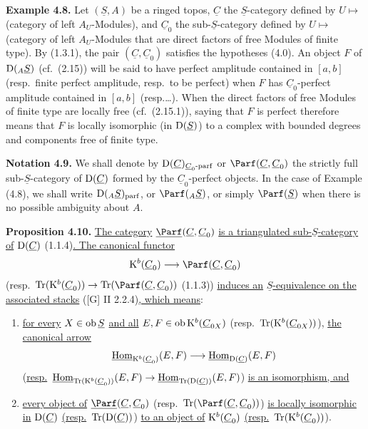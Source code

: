 \textbf{Example 4.8.} Let \((\underline{S},A)\) be a ringed topos, \(\underline{C}\) the \(\underline{S}\)-category defined by \(U\longmapsto\) (category of left \(A_U\)-Modules), and \(\underline{C}_0\) the sub-\(\underline{S}\)-category defined by \(U\longmapsto\) (category of left \(A_U\)-Modules that are direct factors of free Modules of finite type). By (1.3.1), the pair \((\underline{C},\underline{C}_0)\) satisfies the hypotheses (4.0). An object \(F\) of \(\mathrm D(_A \underline{S})\) (cf.\ (2.15)) will be said to have perfect amplitude contained in \([a,b]\) (resp.\ finite perfect amplitude, resp.\ to be perfect) when \(F\) has \(\underline{C}_0\)-perfect amplitude contained in \([a,b]\) (resp.\dots). When the direct factors of free Modules of finite type are locally free (cf.\ (2.15.1)), saying that \(F\) is perfect therefore means that \(F\) is locally isomorphic (in \(\mathrm D(\underline{S})\)) to a complex with bounded degrees and components free of finite type.

\textbf{Notation 4.9.} We shall denote by \(\mathrm D(\underline{C})_{\underline{C}_0\text{-}\mathrm{parf}}\) or \(\Parf(\underline{C},\underline{C}_0)\) the strictly full sub-\(\underline{S}\)-category of \(\mathrm D(\underline{C})\) formed by the \(\underline{C}_0\)-perfect objects. In the case of Example (4.8), we shall write \(\mathrm D(_A \underline{S})_{\mathrm{parf}}\), or \(\Parf(_A \underline{S})\), or simply \(\Parf(\underline{S})\) when there is no possible ambiguity about \(A\).

%
\textbf{Proposition 4.10.} \uline{The category} \(\underline{\Parf}(\underline{C},\underline{C}_0)\) \uline{is a triangulated sub-}\(\underline{S}\)\uline{-category of} \(\mathrm D(\underline{C})\) (1.1.4)\uline{. The canonical functor}
\[
  \Kpx^b(\underline{C}_0)\longrightarrow\Parf(\underline{C},\underline{C}_0)
\]
(resp.\ \(\Tr(\Kpx^b(\underline{C}_0))\to\Tr(\Parf(\underline{C},\underline{C}_0))\) (1.1.3)) \uline{induces an} \(\underline{S}\)\uline{-equivalence on the associated stacks} ([G] II 2.2.4)\uline{, which means}:
\begin{enumerate}[label=(\roman*)]
\item \uline{for every} \(X\in\operatorname{ob} \underline{S}\) \uline{and all} \(E,F\in\operatorname{ob}\mathrm K^b(\underline{C}_{0X})\) (resp.\ \(\operatorname{Tr}(\mathrm K^b(\underline{C}_{0X}))\)), \uline{the canonical arrow}
\[
  \underline{\operatorname{Hom}}_{\mathrm K^b(\underline{C}_0)}(E,F)
  \longrightarrow
  \underline{\operatorname{Hom}}_{\mathrm D(\underline{C})}(E,F)
\]
(\uline{resp.}\ \(\underline{\operatorname{Hom}}_{\operatorname{Tr}(\mathrm K^b(\underline{C}_0))}(E,F)\to\underline{\operatorname{Hom}}_{\operatorname{Tr}(\mathrm D(\underline{C}))}(E,F)\)) \uline{is an isomorphism, and}
\item \uline{every object of} \(\underline{\Parf}(\underline{C},\underline{C}_0)\) (resp.\ \(\Tr(\Parf(\underline{C},\underline{C}_0))\)) \uline{is locally isomorphic in} \(\mathrm D(\underline{C})\) \uline{(resp.}\ \(\operatorname{Tr}(\mathrm D(\underline{C}))\)) \uline{to an object of} \(\mathrm K^b(\underline{C}_0)\) \uline{(resp.}\ \(\operatorname{Tr}(\mathrm K^b(\underline{C}_0))\)).
\end{enumerate}


